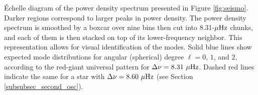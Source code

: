 \label{fig:echelle} \'Echelle diagram of the power density spectrum presented in Figure \ref{fig:seismo}. Darker regions correspond to larger peaks in power density. The power density spectrum is smoothed by a boxcar over nine bins then cut into 8.31-$\mu\rm{Hz}$ chunks, and each of them is then stacked on top of its lower-frequency neighbor. This representation allows for visual identification of the modes. Solid blue lines show expected mode distributions for angular (spherical) degree $\ell = 0$, $1$, and $2$, according to the red-giant universal pattern \citep{mos11} for $\Delta\nu = 8.31\ \mu\rm{Hz}$. Dashed red lines indicate the same for a star with $\Delta\nu = 8.60\ \mu\rm{Hz}$ (see Section \ref{subsubsec_second_osc}).

  